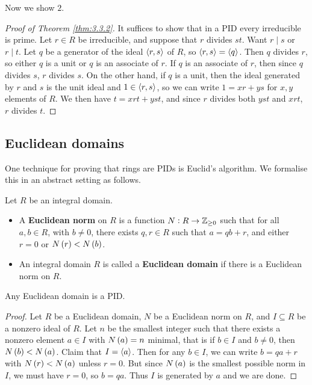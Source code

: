 Now we show $ 2 $.

\begin{proof}[Proof of Theorem \ref{thm:3.3.2}]
It suffices to show that in a PID every irreducible is prime. Let $ r \in R $ be irreducible, and suppose that $ r $ divides $ st $. Want $ r \mid s $ or $ r \mid t $. Let $ q $ be a generator of the ideal $ \left\langle r, s \right\rangle $ of $ R $, so $ \left\langle r, s \right\rangle = \left\langle q \right\rangle $. Then $ q $ divides $ r $, so either $ q $ is a unit or $ q $ is an associate of $ r $. If $ q $ is an associate of $ r $, then since $ q $ divides $ s $, $ r $ divides $ s $. On the other hand, if $ q $ is a unit, then the ideal generated by $ r $ and $ s $ is the unit ideal and $ 1 \in \left\langle r, s \right\rangle $, so we can write $ 1 = xr + ys $ for $ x, y $ elements of $ R $. We then have $ t = xrt + yst $, and since $ r $ divides both $ yst $ and $ xrt $, $ r $ divides $ t $.
\end{proof}


\subsection{Euclidean domains}

One technique for proving that rings are PIDs is Euclid's algorithm. We formalise this in an abstract setting as follows.

\begin{definition}
Let $ R $ be an integral domain.
\begin{itemize}
\item A \textbf{Euclidean norm} on $ R $ is a function $ N : R \to \mathbb{Z}_{\ge 0} $ such that for all $ a, b \in R $, with $ b \ne 0 $, there exists $ q, r \in R $ such that $ a = qb + r $, and either $ r = 0 $ or $ N\br{r} < N\br{b} $.
\item An integral domain $ R $ is called a \textbf{Euclidean domain} if there is a Euclidean norm on $ R $.
\end{itemize}
\end{definition}

\begin{theorem}
Any Euclidean domain is a PID.
\end{theorem}

\begin{proof}
Let $ R $ be a Euclidean domain, $ N $ be a Euclidean norm on $ R $, and $ I \subseteq R $ be a nonzero ideal of $ R $. Let $ n $ be the smallest integer such that there exists a nonzero element $ a \in I $ with $ N\br{a} = n $ minimal, that is if $ b \in I $ and $ b \ne 0 $, then $ N\br{b} < N\br{a} $. Claim that $ I = \left\langle a \right\rangle $. Then for any $ b \in I $, we can write $ b = qa + r $ with $ N\br{r} < N\br{a} $ unless $ r = 0 $. But since $ N\br{a} $ is the smallest possible norm in $ I $, we must have $ r = 0 $, so $ b = qa $. Thus $ I $ is generated by $ a $ and we are done.
\end{proof}


